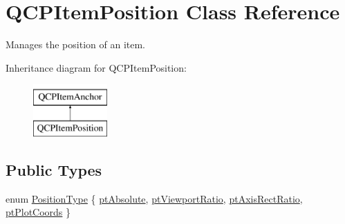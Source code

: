 \hypertarget{classQCPItemPosition}{\section{\-Q\-C\-P\-Item\-Position \-Class \-Reference}
\label{classQCPItemPosition}
}


\-Manages the position of an item.  


\-Inheritance diagram for \-Q\-C\-P\-Item\-Position\-:\begin{figure}[H]
\begin{center}
\leavevmode
\includegraphics[height=2.000000cm]{classQCPItemPosition}
\end{center}
\end{figure}
\subsection*{\-Public \-Types}
\begin{DoxyCompactItemize}
\item 
enum \hyperlink{classQCPItemPosition_aad9936c22bf43e3d358552f6e86dbdc8}{\-Position\-Type} \{ \hyperlink{classQCPItemPosition_aad9936c22bf43e3d358552f6e86dbdc8a564f5e53e550ead1ec5fc7fc7d0b73e0}{pt\-Absolute}, 
\hyperlink{classQCPItemPosition_aad9936c22bf43e3d358552f6e86dbdc8ac7d6aa89ceacb39658b0d6da061c789a}{pt\-Viewport\-Ratio}, 
\hyperlink{classQCPItemPosition_aad9936c22bf43e3d358552f6e86dbdc8a01080fd00eaf09fa238ef6b73bbfef75}{pt\-Axis\-Rect\-Ratio}, 
\hyperlink{classQCPItemPosition_aad9936c22bf43e3d358552f6e86dbdc8ad5ffb8dc99ad73263f7010c77342294c}{pt\-Plot\-Coords}
 \}
\end{DoxyCompactItemize}
